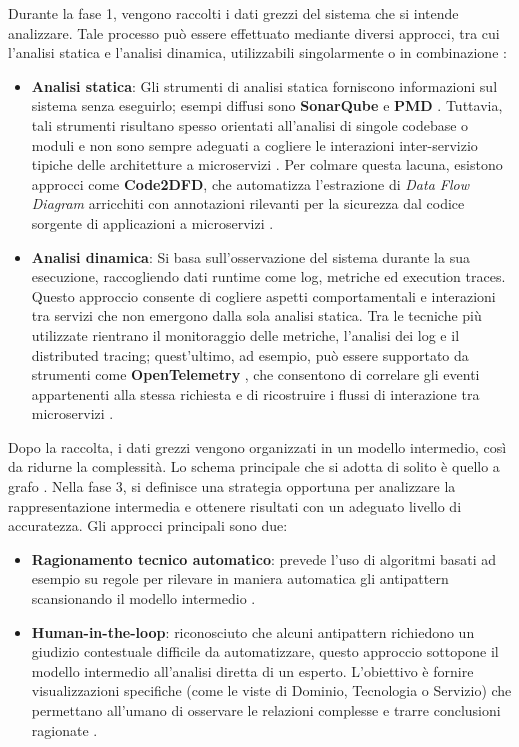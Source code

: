 Durante la fase 1, vengono raccolti i dati grezzi del sistema che si intende analizzare. Tale processo può essere effettuato mediante diversi approcci, tra cui l'analisi statica e l'analisi dinamica, utilizzabili singolarmente o in combinazione \cite{CernyCatalogo}:
\begin{itemize}
    \item \textbf{Analisi statica}: Gli strumenti di analisi statica forniscono informazioni sul sistema senza eseguirlo; esempi diffusi sono \textbf{SonarQube} \cite{SonarQubeServerDocs} e \textbf{PMD} \cite{PMDDocumentation}. Tuttavia, tali strumenti risultano spesso orientati all'analisi di singole codebase o moduli e non sono sempre adeguati a cogliere le interazioni inter-servizio tipiche delle architetture a microservizi \cite{CernyCatalogo, MSAnose}. Per colmare questa lacuna, esistono approcci come \textbf{Code2DFD}, che automatizza l'estrazione di \textit{Data Flow Diagram} arricchiti con annotazioni rilevanti per la sicurezza dal codice sorgente di applicazioni a microservizi \cite{Code2DFD23, Static_Tool}.
    \item \textbf{Analisi dinamica}: Si basa sull'osservazione del sistema durante la sua esecuzione, raccogliendo dati runtime come log, metriche ed execution traces. Questo approccio consente di cogliere aspetti comportamentali e interazioni tra servizi che non emergono dalla sola analisi statica. Tra le tecniche più utilizzate rientrano il monitoraggio delle metriche, l'analisi dei log e il distributed tracing; quest'ultimo, ad esempio, può essere supportato da strumenti come \textbf{OpenTelemetry} \cite{OpenTelemetryDocs}, che consentono di correlare gli eventi appartenenti alla stessa richiesta e di ricostruire i flussi di interazione tra microservizi \cite{CernyCatalogo, Bushong2021}.
\end{itemize}
Dopo la raccolta, i dati grezzi vengono organizzati in un modello intermedio, così da ridurne la complessità. Lo schema principale che si adotta di solito è quello a grafo \cite{CernyCatalogo}.
Nella fase 3, si definisce una strategia opportuna per analizzare la rappresentazione intermedia e ottenere risultati con un adeguato livello di accuratezza.
Gli approcci principali sono due: 
\begin{itemize}
    \item \textbf{Ragionamento tecnico automatico}: prevede l'uso di algoritmi basati ad esempio su regole per rilevare in maniera automatica gli antipattern scansionando il modello intermedio \cite{CernyCatalogo}.
    \item \textbf{Human-in-the-loop}: riconosciuto che alcuni antipattern richiedono un giudizio contestuale difficile da automatizzare, questo approccio sottopone il modello intermedio all'analisi diretta di un esperto. L'obiettivo è fornire visualizzazioni specifiche (come le viste di Dominio, Tecnologia o Servizio) che permettano all'umano di osservare le relazioni complesse e trarre conclusioni ragionate \cite{CernyCatalogo}.
\end{itemize}

